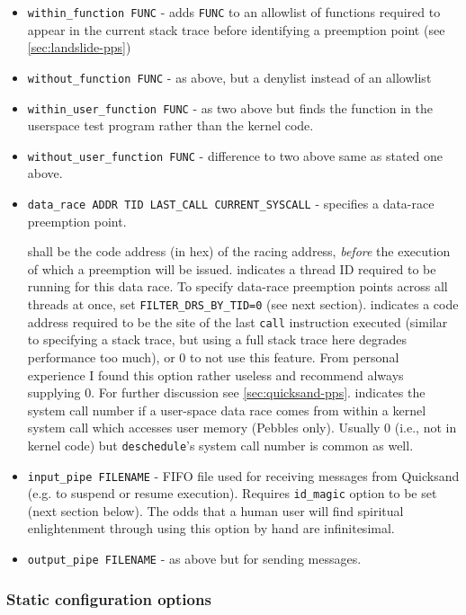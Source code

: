 \begin{itemize}
	\item {\tt within\_function FUNC} - adds {\tt FUNC} to an allowlist of functions required to appear in the current stack trace before identifying a preemption point (see \cref{sec:landslide-pps})
	\item {\tt without\_function FUNC} - as above, but a denylist instead of an allowlist
	\item {\tt within\_user\_function FUNC} - as two above but finds the function in the userspace test program rather than the kernel code.
	\item {\tt without\_user\_function FUNC} - difference to two above same as stated one above.
	\item {\tt data\_race ADDR TID LAST\_CALL CURRENT\_SYSCALL} - specifies a data-race preemption point.
		\begin{itemize}
			 shall be the code address (in hex) of the racing address,
			{\em before} the execution of which a preemption will be issued.
			 indicates a thread ID required to be running for this data race.
				To specify data-race preemption points across all threads at once, set {\tt FILTER\_DRS\_BY\_TID=0} (see next section).
			 indicates a code address required to be the site of the last {\tt call} instruction executed
				(similar to specifying a stack trace, but using a full stack trace here degrades performance too much),
				or 0 to not use this feature.
				From personal experience I found this option rather useless and recommend always supplying 0.
				For further discussion see \cref{sec:quicksand-pps}.
			 indicates the system call number if a user-space data race comes from within a kernel system call which accesses user memory (Pebbles only).
				Usually 0 (i.e., not in kernel code) but {\tt deschedule}'s system call number is common as well.
		\end{itemize}
	\item {\tt input\_pipe FILENAME} - FIFO file used for receiving messages from Quicksand (e.g. to suspend or resume execution).
		Requires {\tt id\_magic} option to be set (next section below).
		The odds that a human user will find spiritual enlightenment through using this option by hand are infinitesimal.
	\item {\tt output\_pipe FILENAME} - as above but for sending messages.
\end{itemize}

\subsubsection{Static configuration options}
\label{sec:landslide-staticconfig}

